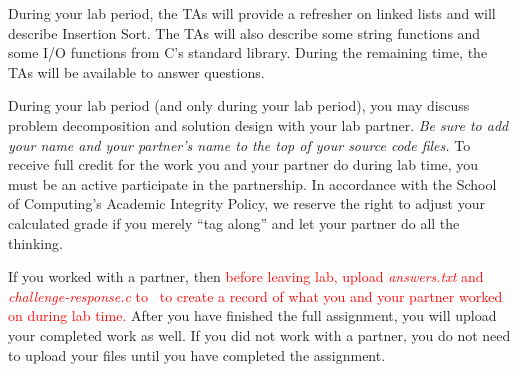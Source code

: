 During your lab period, the TAs will provide a refresher on linked lists and will describe Insertion Sort.
The TAs will also describe some string functions and some I/O functions from C's standard library.
During the remaining time, the TAs will be available to answer questions.

During your lab period (and only during your lab period), you may discuss problem decomposition and solution design with your lab partner.
\textit{Be sure to add your name and your partner's name to the top of your source code files.}
To receive full credit for the work you and your partner do during lab time, you must be an active participate in the partnership.
In accordance with the School of Computing's Academic Integrity Policy, we reserve the right to adjust your calculated grade if you merely ``tag along'' and let your partner do all the thinking.

If you worked with a partner, then \textcolor{red}{before leaving lab, upload \textit{answers.txt} and \textit{challenge-response.c} to \filesubmission\ to create a record of what you and your partner worked on during lab time.}
After you have finished the full assignment, you will upload your completed work as well.
If you did not work with a partner, you do not need to upload your files until you have completed the assignment.